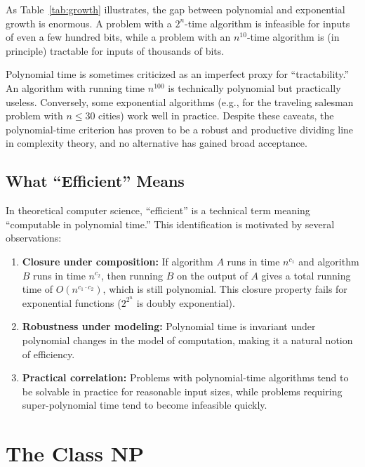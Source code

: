 As Table~\ref{tab:growth} illustrates, the gap between polynomial and exponential growth is enormous. A problem with a $2^n$-time algorithm is infeasible for inputs of even a few hundred bits, while a problem with an $n^{10}$-time algorithm is (in principle) tractable for inputs of thousands of bits.

\begin{remark}
Polynomial time is sometimes criticized as an imperfect proxy for ``tractability.'' An algorithm with running time $n^{100}$ is technically polynomial but practically useless. Conversely, some exponential algorithms (e.g., for the traveling salesman problem with $n \le 30$ cities) work well in practice. Despite these caveats, the polynomial-time criterion has proven to be a robust and productive dividing line in complexity theory, and no alternative has gained broad acceptance.
\end{remark}

\subsection{What ``Efficient'' Means}

In theoretical computer science, ``efficient'' is a technical term meaning ``computable in polynomial time.'' This identification is motivated by several observations:

\begin{enumerate}
  \item \textbf{Closure under composition:} If algorithm $A$ runs in time $n^{c_1}$ and algorithm $B$ runs in time $n^{c_2}$, then running $B$ on the output of $A$ gives a total running time of $O(n^{c_1 \cdot c_2})$, which is still polynomial. This closure property fails for exponential functions ($2^{2^n}$ is doubly exponential).
  \item \textbf{Robustness under modeling:} Polynomial time is invariant under polynomial changes in the model of computation, making it a natural notion of efficiency.
  \item \textbf{Practical correlation:} Problems with polynomial-time algorithms tend to be solvable in practice for reasonable input sizes, while problems requiring super-polynomial time tend to become infeasible quickly.
\end{enumerate}

\section{The Class NP}

